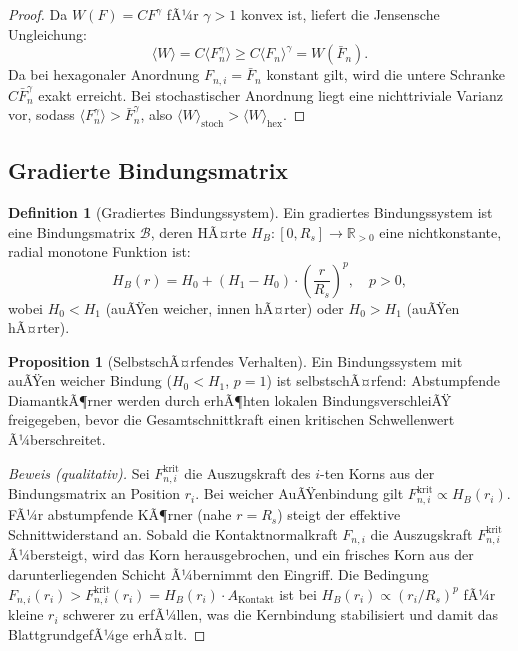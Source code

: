 ﻿\documentclass[a4paper,12pt]{article}
\theoremstyle{definition}
\newtheorem{definition}{Definition}
\newtheorem{proposition}{Proposition}
\begin{document}
\begin{proof}
Da $W(F) = CF^{\gamma}$ fÃ¼r $\gamma > 1$ konvex ist, liefert die Jensensche Ungleichung:
\[
\langle W \rangle = C \langle F_n^{\gamma} \rangle \geq C \langle F_n \rangle^{\gamma} = W(\bar{F}_n).
\]
Da bei hexagonaler Anordnung $F_{n,i} = \bar{F}_n$ konstant gilt, wird die untere Schranke
$C\bar{F}_n^{\gamma}$ exakt erreicht. Bei stochastischer Anordnung liegt eine nichttriviale
Varianz vor, sodass $\langle F_n^{\gamma}\rangle > \bar{F}_n^{\gamma}$, also
$\langle W\rangle_{\mathrm{stoch}} > \langle W\rangle_{\mathrm{hex}}$.
\end{proof}

\subsection{Gradierte Bindungsmatrix}
\label{sec:bindung}

\begin{definition}[Gradiertes Bindungssystem]
Ein gradiertes Bindungssystem ist eine Bindungsmatrix $\mathcal{B}$, deren
HÃ¤rte $H_B: [0, R_s] \to \mathbb{R}_{>0}$ eine nichtkonstante, radial monotone Funktion ist:
\[
H_B(r) = H_0 + (H_1 - H_0)\cdot\left(\frac{r}{R_s}\right)^{p}, \quad p > 0,
\]
wobei $H_0 < H_1$ (auÃŸen weicher, innen hÃ¤rter) oder $H_0 > H_1$ (auÃŸen hÃ¤rter).
\end{definition}

\begin{proposition}[SelbstschÃ¤rfendes Verhalten]
\label{prop:selbstschaerfend}
Ein Bindungssystem mit auÃŸen weicher Bindung ($H_0 < H_1$, $p = 1$) ist selbstschÃ¤rfend:
Abstumpfende DiamantkÃ¶rner werden durch erhÃ¶hten lokalen BindungsverschleiÃŸ freigegeben,
bevor die Gesamtschnittkraft einen kritischen Schwellenwert Ã¼berschreitet.
\end{proposition}

\begin{proof}[Beweis (qualitativ)]
Sei $F_{n,i}^{\mathrm{krit}}$ die Auszugskraft des $i$-ten Korns aus der Bindungsmatrix
an Position $r_i$. Bei weicher AuÃŸenbindung gilt $F_{n,i}^{\mathrm{krit}} \propto H_B(r_i)$.
FÃ¼r abstumpfende KÃ¶rner (nahe $r = R_s$) steigt der effektive Schnittwiderstand an.
Sobald die Kontaktnormalkraft $F_{n,i}$ die Auszugskraft $F_{n,i}^{\mathrm{krit}}$ Ã¼bersteigt,
wird das Korn herausgebrochen, und ein frisches Korn aus der darunterliegenden Schicht
Ã¼bernimmt den Eingriff. Die Bedingung $F_{n,i}(r_i) > F_{n,i}^{\mathrm{krit}}(r_i) = H_B(r_i) \cdot A_{\mathrm{Kontakt}}$
ist bei $H_B(r_i) \propto (r_i/R_s)^p$ fÃ¼r kleine $r_i$ schwerer zu erfÃ¼llen,
was die Kernbindung stabilisiert und damit das BlattgrundgefÃ¼ge erhÃ¤lt.
\end{proof}
\end{document}

